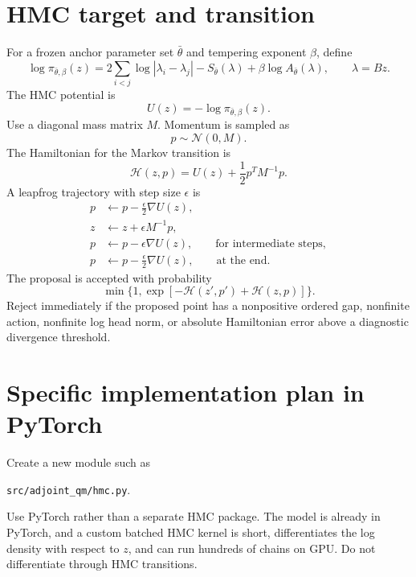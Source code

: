 \documentclass[11pt]{article}
\begin{document}
\section{HMC target and transition}

For a frozen anchor parameter set $\bar\theta$ and tempering exponent $\beta$, define
\begin{equation}
 \log\pi_{\bar\theta,\beta}(z)
 =2\sum_{i<j}\log|\lambda_i-\lambda_j|
 -S_{\bar\theta}(\lambda)
 +\beta\log A_{\bar\theta}(\lambda),
 \qquad \lambda=Bz.
 \label{eq:hmc_logpi}
\end{equation}
The HMC potential is
\begin{equation}
 U(z)=-\log\pi_{\bar\theta,\beta}(z).
\end{equation}
Use a diagonal mass matrix $M$.  Momentum is sampled as
\begin{equation}
 p\sim\mathcal N(0,M).
\end{equation}
The Hamiltonian for the Markov transition is
\begin{equation}
 \mathcal H(z,p)=U(z)+\frac12p^TM^{-1}p.
\end{equation}
A leapfrog trajectory with step size $\epsilon$ is
\begin{align}
 p&\leftarrow p-\frac\epsilon2\nabla U(z),\\
 z&\leftarrow z+\epsilon M^{-1}p,\\
 p&\leftarrow p-\epsilon\nabla U(z),\qquad\text{for intermediate steps},\\
 p&\leftarrow p-\frac\epsilon2\nabla U(z),\qquad\text{at the end}.
\end{align}
The proposal is accepted with probability
\begin{equation}
 \min\{1,\exp[-\mathcal H(z',p')+\mathcal H(z,p)]\}.
\end{equation}
Reject immediately if the proposed point has a nonpositive ordered gap, nonfinite action, nonfinite log head norm, or absolute Hamiltonian error above a diagnostic divergence threshold.

\section{Specific implementation plan in PyTorch}

Create a new module such as
\begin{center}
\texttt{src/adjoint\_qm/hmc.py}.
\end{center}
Use PyTorch rather than a separate HMC package.  The model is already in PyTorch, and a custom batched HMC kernel is short, differentiates the log density with respect to $z$, and can run hundreds of chains on GPU.  Do not differentiate through HMC transitions.
\end{document}
